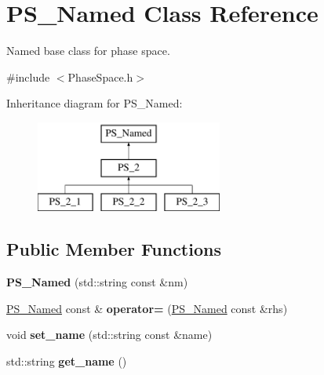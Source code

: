 \hypertarget{classPS__Named}{}\section{P\+S\+\_\+\+Named Class Reference}
\label{classPS__Named}


Named base class for phase space.  




{\ttfamily \#include $<$Phase\+Space.\+h$>$}

Inheritance diagram for P\+S\+\_\+\+Named\+:\begin{figure}[H]
\begin{center}
\leavevmode
\includegraphics[height=3.000000cm]{classPS__Named}
\end{center}
\end{figure}
\subsection*{Public Member Functions}
\begin{DoxyCompactItemize}
\item 
\hypertarget{classPS__Named_ae9995f08b542e78ca1a9dc96805ebfdf}{}{\bfseries P\+S\+\_\+\+Named} (std\+::string const \&nm)\label{classPS__Named_ae9995f08b542e78ca1a9dc96805ebfdf}

\item 
\hypertarget{classPS__Named_a49250b5b43dce6fc026241d023d0e155}{}\hyperlink{classPS__Named}{P\+S\+\_\+\+Named} const \& {\bfseries operator=} (\hyperlink{classPS__Named}{P\+S\+\_\+\+Named} const \&rhs)\label{classPS__Named_a49250b5b43dce6fc026241d023d0e155}

\item 
\hypertarget{classPS__Named_ae072e1468a73ca31410d4cce3be6a6e9}{}void {\bfseries set\+\_\+name} (std\+::string const \&name)\label{classPS__Named_ae072e1468a73ca31410d4cce3be6a6e9}

\item 
\hypertarget{classPS__Named_a5b6f04214d47c462f7bc65c4ed5e867f}{}std\+::string {\bfseries get\+\_\+name} ()\label{classPS__Named_a5b6f04214d47c462f7bc65c4ed5e867f}

\end{DoxyCompactItemize}

